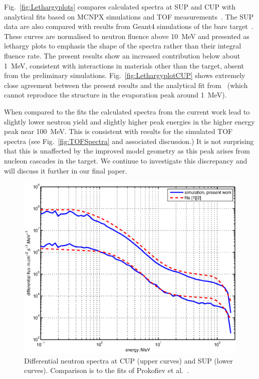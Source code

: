 \documentclass[peerreviewca,11pt,a4paper]{IEEEtran}
\let\MYoriglatexcaption\caption
\renewcommand{\caption}[2][\relax]{\MYoriglatexcaption[#2]{#2}}
\begin{document}
Fig.~\ref{fig:Lethargyplots} compares calculated spectra at SUP and CUP with analytical fits based on MCNPX simulations and TOF measurements~\cite{Prokofiev2009,Prokofiev2014}.
The SUP data are also compared with results from Geant4 simulations of the bare target~\cite{Platt2013}.
These curves are normalised to neutron fluence above \SI{10}{\MeV} and presented as lethargy plots to emphasis the shape of the spectra rather than their integral fluence rate.
The present results show an increased contribution below about \SI{1}{\MeV}, consistent with interactions in materials other than the target, absent from the preliminary simulations.
Fig.~\ref{fig:LethargyplotCUP} shows extremely close agreement between the present results and the analytical fit from~\cite{Prokofiev2014} (which cannot reproduce the structure in the evaporation peak around \SI{1}{\MeV}).

When compared to the fits the calculated spectra from the current work lead to slightly lower neutron yield and slightly higher peak energies in the higher energy peak near \SI{100}{\MeV}.
This is consistent with results for the simulated TOF spectra (see Fig.~\ref{fig:TOFSpectra} and associated discussion.)
It is not surprising that this is unaffected by the improved model geometry as this peak arises from nucleon cascades in the target.
We continue to investigate this discrepancy and will discuss it further in our final paper.

\begin{figure}[!t]
    \centering
    \includegraphics[width=0.9\columnwidth]{DiffYieldComparedSUPCUP10RADECS.eps}
    \caption{
        Differential neutron spectra at CUP (upper curves) and SUP (lower curves).
        Comparison is to the fits of Prokofiev et al.~\cite{Prokofiev2009,Prokofiev2014}.
    }
    \label{fig:DifferentialSpectra}
\end{figure}
\end{document}
